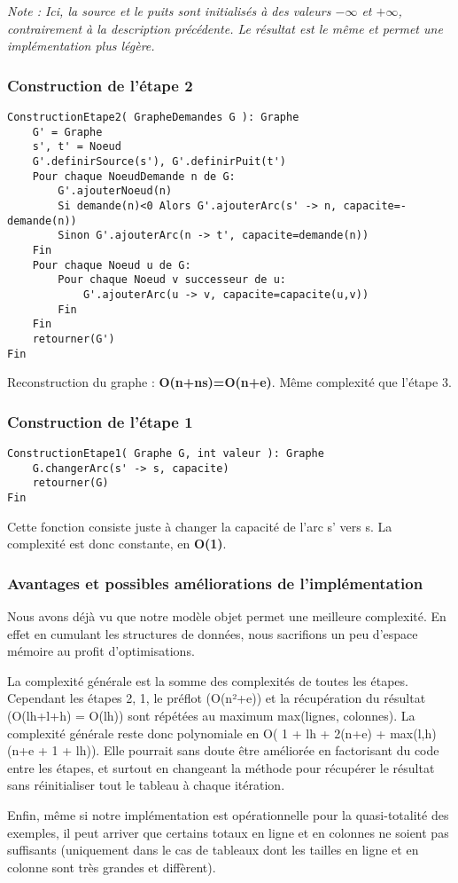 \documentclass[letterpaper,12pt]{article}
\begin{document}
\textit{Note : Ici, la source et le puits sont initialisés à des valeurs $-\infty$ et $+\infty$, contrairement à la description précédente. Le résultat est le même et permet une implémentation plus légère.}
\hfill \break

\subsubsection{Construction de l'étape 2}
\begin{lstlisting}
ConstructionEtape2( GrapheDemandes G ): Graphe
    G' = Graphe
    s', t' = Noeud
    G'.definirSource(s'), G'.definirPuit(t')
    Pour chaque NoeudDemande n de G:
        G'.ajouterNoeud(n)
        Si demande(n)<0 Alors G'.ajouterArc(s' -> n, capacite=-demande(n))
        Sinon G'.ajouterArc(n -> t', capacite=demande(n))
    Fin
    Pour chaque Noeud u de G:
        Pour chaque Noeud v successeur de u:
            G'.ajouterArc(u -> v, capacite=capacite(u,v))
        Fin
    Fin
    retourner(G')
Fin

\end{lstlisting}
Reconstruction du graphe : \textbf{O(n+ns)=O(n+e)}. Même complexité que l'étape 3.
\hfill \break

\subsubsection{Construction de l'étape 1}
\begin{lstlisting}
ConstructionEtape1( Graphe G, int valeur ): Graphe
    G.changerArc(s' -> s, capacite)
    retourner(G)
Fin
\end{lstlisting}
Cette fonction consiste juste à changer la capacité de l'arc s' vers s. La complexité est donc constante, en \textbf{O(1)}. 
\hfill \break
\subsubsection{Avantages et possibles améliorations de l'implémentation}
Nous avons déjà vu que notre modèle objet permet une meilleure complexité. En effet en cumulant les structures de données, nous sacrifions un peu d'espace mémoire au profit d'optimisations. 

La complexité générale est la somme des complexités de toutes les étapes. Cependant les étapes 2, 1, le préflot (O(n²+e)) et la récupération du résultat (O(lh+l+h) = O(lh))  sont répétées au maximum max(lignes, colonnes). La complexité générale reste donc polynomiale en O( 1 + lh + 2(n+e) + max(l,h)(n+e + 1 + lh)).
Elle pourrait sans doute être améliorée en factorisant du code entre les étapes, et surtout en changeant la méthode pour récupérer le résultat sans réinitialiser tout le tableau à chaque itération.

Enfin, même si notre implémentation est opérationnelle pour la quasi-totalité des exemples, il peut arriver que certains totaux en ligne et en colonnes ne soient pas suffisants (uniquement dans le cas de tableaux dont les tailles en ligne et en colonne sont très grandes et diffèrent).
\end{document}
